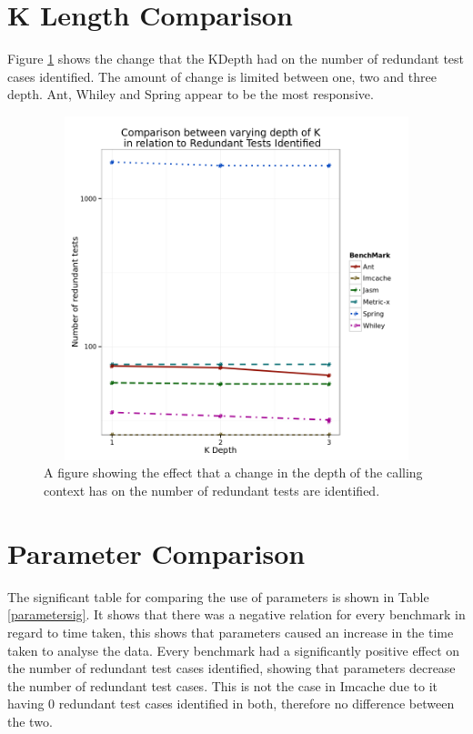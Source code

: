 \section{K Length Comparison}
Figure \ref{fig:kdepthgraph} shows the change that the KDepth had on the number of redundant test cases identified. The amount of change is limited between one, two and three depth. Ant, Whiley and Spring appear to be the most responsive. 

\begin{figure}[H]
\begin{center}
\includegraphics[height=10cm, width = 14.5cm]{KDepth.png}
\end{center}
\caption{A figure showing the effect that a change in the depth of the calling context has on the number of redundant tests are identified.}
\label{fig:kdepthgraph}
\end{figure}

\section{Parameter Comparison}

The significant table for comparing the use of parameters is shown in Table \ref{parametersig}. It shows that there was a negative relation for every benchmark in regard to time taken, this shows that parameters caused an increase in the time taken to analyse the data. Every benchmark had a significantly positive effect on the number of redundant test cases identified, showing that parameters decrease the number of redundant test cases. This is not the case in Imcache due to it having 0 redundant test cases identified in both, therefore no difference between the two.


